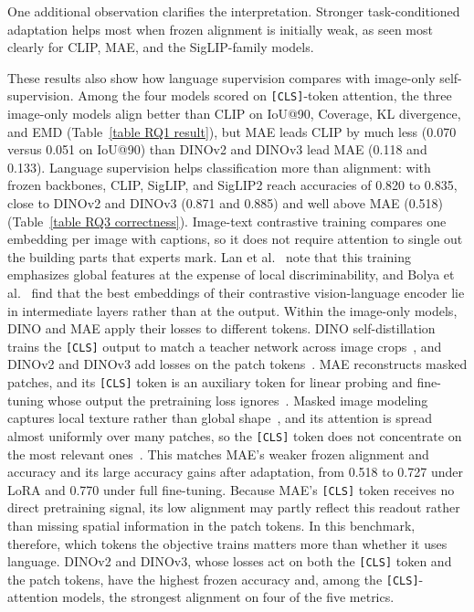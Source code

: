 \documentclass[lineno,pdflatex,sn-mathphys-num]{sn-jnl}%
\theoremstyle{thmstyleone}%
\theoremstyle{thmstyletwo}%
\theoremstyle{thmstylethree}%
\begin{document}
One additional observation clarifies the interpretation. Stronger task-conditioned adaptation helps most when frozen alignment is initially weak, as seen most clearly for CLIP, MAE, and the SigLIP-family models.

These results also show how language supervision compares with image-only self-supervision. Among the four models scored on \texttt{[CLS]}-token attention, the three image-only models align better than CLIP on IoU@90, Coverage, KL divergence, and EMD (Table~\ref{table RQ1 result}), but MAE leads CLIP by much less (0.070 versus 0.051 on IoU@90) than DINOv2 and DINOv3 lead MAE (0.118 and 0.133). Language supervision helps classification more than alignment: with frozen backbones, CLIP, SigLIP, and SigLIP2 reach accuracies of 0.820 to 0.835, close to DINOv2 and DINOv3 (0.871 and 0.885) and well above MAE (0.518) (Table~\ref{table RQ3 correctness}). Image-text contrastive training compares one embedding per image with captions, so it does not require attention to single out the building parts that experts mark. Lan et al.~\cite{Lan24ClearCLIP} note that this training emphasizes global features at the expense of local discriminability, and Bolya et al.~\cite{Bolya25PE} find that the best embeddings of their contrastive vision-language encoder lie in intermediate layers rather than at the output. Within the image-only models, DINO and MAE apply their losses to different tokens. DINO self-distillation trains the \texttt{[CLS]} output to match a teacher network across image crops~\cite{Caron21DINO}, and DINOv2 and DINOv3 add losses on the patch tokens~\cite{Oquab24DINOv2,Simeoni26DINOv3}. MAE reconstructs masked patches, and its \texttt{[CLS]} token is an auxiliary token for linear probing and fine-tuning whose output the pretraining loss ignores~\cite{He22MAE}. Masked image modeling captures local texture rather than global shape~\cite{park2023what}, and its attention is spread almost uniformly over many patches, so the \texttt{[CLS]} token does not concentrate on the most relevant ones~\cite{Przewiezlikowski25ICCV}. This matches MAE's weaker frozen alignment and accuracy and its large accuracy gains after adaptation, from 0.518 to 0.727 under LoRA and 0.770 under full fine-tuning. Because MAE's \texttt{[CLS]} token receives no direct pretraining signal, its low alignment may partly reflect this readout rather than missing spatial information in the patch tokens. In this benchmark, therefore, which tokens the objective trains matters more than whether it uses language. DINOv2 and DINOv3, whose losses act on both the \texttt{[CLS]} token and the patch tokens, have the highest frozen accuracy and, among the \texttt{[CLS]}-attention models, the strongest alignment on four of the five metrics.
\end{document}
